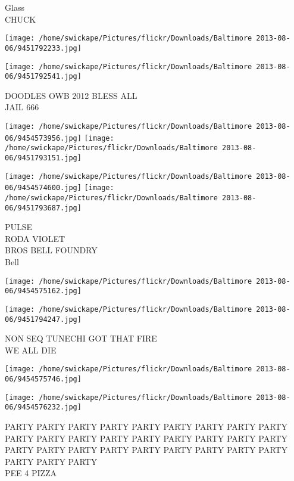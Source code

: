 \documentclass[10pt,letterpaper]{article}
\begin{document}
Glass\\
CHUCK\\
\pagebreak

\texttt{[image: /home/swickape/Pictures/flickr/Downloads/Baltimore 2013-08-06/9451792233.jpg]}

\vspace{0.25in}
\texttt{[image: /home/swickape/Pictures/flickr/Downloads/Baltimore 2013-08-06/9451792541.jpg]}

DOODLES OWB 2012 BLESS ALL\\
JAIL 666\\
\pagebreak

\texttt{[image: /home/swickape/Pictures/flickr/Downloads/Baltimore 2013-08-06/9454573956.jpg]}
\texttt{[image: /home/swickape/Pictures/flickr/Downloads/Baltimore 2013-08-06/9451793151.jpg]}

\texttt{[image: /home/swickape/Pictures/flickr/Downloads/Baltimore 2013-08-06/9454574600.jpg]}
\texttt{[image: /home/swickape/Pictures/flickr/Downloads/Baltimore 2013-08-06/9451793687.jpg]}

PULSE\\
RODA VIOLET\\
BROS BELL FOUNDRY\\
Bell\\
\pagebreak

\texttt{[image: /home/swickape/Pictures/flickr/Downloads/Baltimore 2013-08-06/9454575162.jpg]}

\vspace{0.25in}
\texttt{[image: /home/swickape/Pictures/flickr/Downloads/Baltimore 2013-08-06/9451794247.jpg]}

NON SEQ TUNECHI GOT THAT FIRE\\
WE ALL DIE\\
\pagebreak

\texttt{[image: /home/swickape/Pictures/flickr/Downloads/Baltimore 2013-08-06/9454575746.jpg]}

\vspace{0.25in}
\texttt{[image: /home/swickape/Pictures/flickr/Downloads/Baltimore 2013-08-06/9454576232.jpg]}

PARTY PARTY PARTY PARTY PARTY PARTY PARTY PARTY PARTY PARTY PARTY PARTY PARTY PARTY PARTY PARTY PARTY PARTY PARTY PARTY PARTY PARTY PARTY PARTY PARTY PARTY PARTY PARTY PARTY PARTY\\
PEE 4 PIZZA\\
\pagebreak
\end{document}
